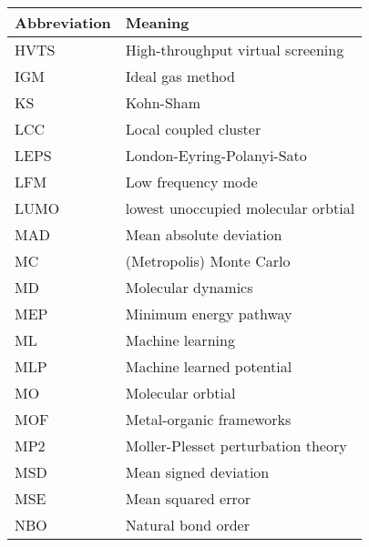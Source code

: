 \documentclass[main.tex]{subfiles}
\begin{document}
\begin{table}[h!]
\def\arraystretch{2.0}
\begin{tabularx}{\textwidth}{YY}
Abbreviation & Meaning \\
\hline
HVTS	&	High-throughput virtual screening	\\
IGM	&	Ideal gas method	\\
KS	&	Kohn-Sham	\\
LCC	&	Local coupled cluster	\\
LEPS	&	London-Eyring-Polanyi-Sato	\\
LFM	&	Low frequency mode	\\
LUMO	&	lowest unoccupied molecular orbtial	\\
MAD	&	Mean absolute deviation	\\
MC	&	(Metropolis) Monte Carlo	\\
MD	&	Molecular dynamics	\\
MEP	&	Minimum energy pathway	\\
ML	&	Machine learning	\\
MLP	&	Machine learned potential	\\
MO	&	Molecular orbtial	\\
MOF	&	Metal-organic frameworks	\\
MP2	&	Moller-Plesset perturbation theory	\\
MSD	&	Mean signed deviation	\\
MSE	&	Mean squared error	\\
NBO	&	Natural bond order	\\
\end{tabularx}
\end{table}
\newpage
\end{document}
